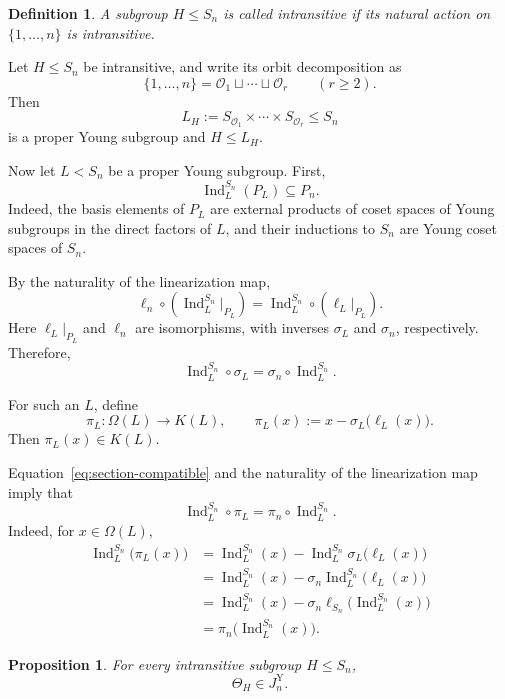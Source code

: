 \documentclass[a4paper,11pt]{article}
\numberwithin{equation}{section}
\newtheorem{proposition}[theorem]{Proposition}
\newtheorem{definition}[theorem]{Definition}
\newcommand{\Ind}{\operatorname{Ind}}
\begin{document}
\begin{definition}\label{def:intransitive-subgroup}
A subgroup $H\le S_n$ is called \emph{intransitive} if its natural action on
$\{1,\ldots,n\}$ is intransitive.
\end{definition}

Let $H\le S_n$ be intransitive, and write its orbit decomposition as
\[
  \{1,\ldots,n\}
  =
  \mathcal O_1\sqcup\cdots\sqcup\mathcal O_r
  \qquad
  (r\ge2).
\]
Then
\[
  L_H
  :=
  S_{\mathcal O_1}\times\cdots\times S_{\mathcal O_r}
  \le S_n
\]
is a proper Young subgroup and $H\le L_H$.

Now let $L<S_n$ be a proper Young subgroup. First,
\[
  \Ind_L^{S_n}(P_L)\subseteq P_n.
\]
Indeed, the basis elements of $P_L$ are external products of coset spaces of
Young subgroups in the direct factors of $L$, and their inductions to $S_n$ are
Young coset spaces of $S_n$.

By the naturality of the linearization map,
\[
  \ell_n\circ
  \left(\Ind_L^{S_n}|_{P_L}\right)
  =
  \Ind_L^{S_n}\circ
  \left(\ell_L|_{P_L}\right).
\]
Here $\ell_L|_{P_L}$ and $\ell_n$ are isomorphisms, with inverses $\sigma_L$
and $\sigma_n$, respectively. Therefore,
\begin{equation}\label{eq:section-compatible}
  \Ind_L^{S_n}\circ\sigma_L
  =
  \sigma_n\circ\Ind_L^{S_n}.
\end{equation}

For such an $L$, define
\[
  \pi_L:\Omega(L)\longrightarrow K(L),
  \qquad
  \pi_L(x)
  :=
  x-\sigma_L\bigl(\ell_L(x)\bigr).
\]
Then $\pi_L(x)\in K(L)$.

Equation~\eqref{eq:section-compatible} and the naturality of the linearization
map imply that
\begin{equation}\label{eq:pi-induction-compatible}
  \Ind_L^{S_n}\circ\pi_L
  =
  \pi_n\circ\Ind_L^{S_n}.
\end{equation}
Indeed, for $x\in\Omega(L)$,
\[
\begin{aligned}
  \Ind_L^{S_n}\bigl(\pi_L(x)\bigr)
  &=
  \Ind_L^{S_n}(x)
  -
  \Ind_L^{S_n}
  \sigma_L\bigl(\ell_L(x)\bigr)\\
  &=
  \Ind_L^{S_n}(x)
  -
  \sigma_n
  \Ind_L^{S_n}\bigl(\ell_L(x)\bigr)\\
  &=
  \Ind_L^{S_n}(x)
  -
  \sigma_n
  \ell_{S_n}\bigl(\Ind_L^{S_n}(x)\bigr)\\
  &=
  \pi_n\bigl(\Ind_L^{S_n}(x)\bigr).
\end{aligned}
\]

\begin{proposition}\label{prop:intransitive-in-Y}
For every intransitive subgroup $H\le S_n$,
\[
  \Theta_H\in J_n^{\mathrm Y}.
\]
\end{proposition}
\end{document}
